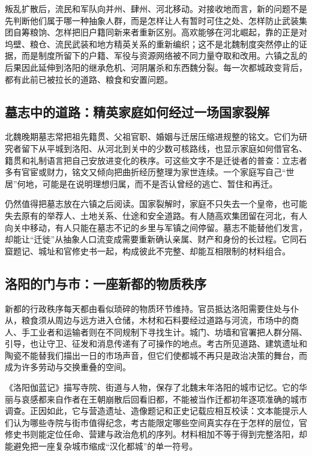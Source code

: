 叛乱扩散后，流民和军队向并州、肆州、河北移动。对接收地而言，新的问题不是先判断他们属于哪一种抽象人群，而是怎样让人有暂时可住之处、怎样防止武装集团自筹粮饷、怎样把旧户籍同新来者重新区别。高欢能够在河北崛起，靠的正是对坞壁、粮仓、流民武装和地方精英关系的重新编织；这不是北魏制度突然停止的证据，而是制度所留下的户籍、军役与资源网络被不同力量夺取和改用。六镇之乱的后果因此延伸到洛阳的继承危机、河阴屠杀和东西魏分裂。每一次都城政变背后，都有此前已被拉长的道路、粮食和安置问题。

\subsection{墓志中的道路：精英家庭如何经过一场国家裂解}

北魏晚期墓志常把祖先籍贯、父祖官职、婚姻与迁居压缩进规整的铭文。它们为研究者留下从平城到洛阳、从河北到关中的少数可核路线，也显示家庭如何借官名、籍贯和礼制语言把自己安放进变化的秩序。可这些文字不是迁徙者的普查：立志者多有官宦或财力，铭文又倾向把曲折经历整理为家世连续。一个家庭写自己“世居”何地，可能是在说明理想归属，而不是否认曾经的逃亡、暂住和再迁。

仍然值得把墓志放在六镇之后阅读。国家裂解时，家庭不只失去一个皇帝，也可能失去原有的举荐人、土地关系、仕途和安全道路。有人随高欢集团留在河北，有人向关中移动，有人只能在墓志不记的乡里与军镇之间停留。墓志不能替他们发言，却能让“迁徙”从抽象人口流变成需要重新确认亲属、财产和身份的长过程。它同石窟题记、城址和官修史书一起，构成彼此不完整、却能互相限制的材料组合。

\subsection{洛阳的门与市：一座新都的物质秩序}

新都的行政秩序每天都由看似琐碎的物质环节维持。官员抵达洛阳需要住处与仆从，粮食须从周边与远方进入仓储，木材和石料要经过道路与河流，市场中的商人、手工业者和运输者则在不同规制下寻找生计。城门、坊墙和官署把人群分隔、引导，也让守卫、征发和消息传递有了可操作的地点。考古所见道路、建筑遗址和陶瓷不能替我们描出一日的市场声音，但它们使都城不再只是政治决策的舞台，而成为许多劳动与交换重叠的空间。

《洛阳伽蓝记》描写寺院、街道与人物，保存了北魏末年洛阳的城市记忆。它的华丽与哀感都来自作者在王朝崩散后回看旧都，不能被当作迁都初年逐项准确的城市调查。正因如此，它与营造遗址、造像题记和正史记载应相互校读：文本能提示人们认为哪些寺院与街市值得纪念，考古能限定哪些空间真实存在于怎样的层位，官修史书则能定位任命、营建与政治危机的序列。材料相加不等于得到完整洛阳，却能避免把一座复杂城市缩成“汉化都城”的单一符号。

